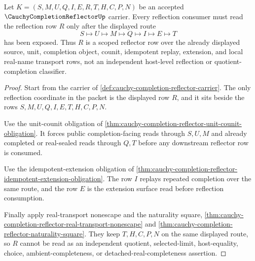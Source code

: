 \begin{theorem}
\label{thm:cauchy-completion-reflector-reflection-scope}
Let $K=(S,M,U,Q,I,E,R,T,H,C,P,N)$ be an accepted $\CauchyCompletionReflectorUp$ carrier. Every reflection consumer must read the reflection row $R$ only after the displayed route
$$
S\longmapsto U\longmapsto M\longmapsto Q\longmapsto I\longmapsto E\longmapsto T
$$
has been exposed. Thus $R$ is a scoped reflector row over the already displayed source, unit, completion object, counit, idempotent replay, extension, and local real-name transport rows, not an independent host-level reflection or quotient-completion classifier.
\end{theorem}
\begin{proof}
Start from the carrier of \autoref{def:cauchy-completion-reflector-carrier}. The only reflection coordinate in the packet is the displayed row $R$, and it sits beside the rows $S,M,U,Q,I,E,T,H,C,P,N$.

Use the unit-counit obligation of \autoref{thm:cauchy-completion-reflector-unit-counit-obligation}. It forces public completion-facing reads through $S,U,M$ and already completed or real-sealed reads through $Q,T$ before any downstream reflector row is consumed.

Use the idempotent-extension obligation of \autoref{thm:cauchy-completion-reflector-idempotent-extension-obligation}. The row $I$ replays repeated completion over the same route, and the row $E$ is the extension surface read before reflection consumption.

Finally apply real-transport nonescape and the naturality square, \autoref{thm:cauchy-completion-reflector-real-transport-nonescape} and \autoref{thm:cauchy-completion-reflector-naturality-square}. They keep $T,H,C,P,N$ on the same displayed route, so $R$ cannot be read as an independent quotient, selected-limit, host-equality, choice, ambient-completeness, or detached-real-completeness assertion.
\end{proof}

